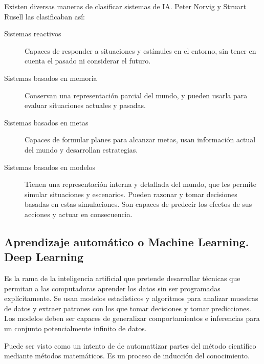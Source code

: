     Existen diversas maneras de clasificar sistemas de IA. Peter Norvig y Struart Rusell las clasificaban así:
    \begin{description}
        \item[Sistemas reactivos] Capaces de responder a situaciones y estímules en el entorno, sin tener en cuenta el pasado ni considerar el futuro.
        \item[Sistemas basados en memoria] Conservan una representación parcial del mundo, y pueden usarla para evaluar situaciones actuales y pasadas.
        \item[Sistemas basados en metas] Capaces de formular planes para alcanzar metas, usan información actual del mundo y desarrollan estrategias.
        \item[Sistemas basados en modelos]  Tienen una representación interna y detallada del mundo, que les permite simular situaciones y escenarios. Pueden razonar y tomar decisiones basadas en estas simulaciones. Son capaces de predecir los efectos de sus acciones y actuar en consecuencia.
    \end{description}

\subsection{Aprendizaje automático o Machine Learning. Deep Learning}
    Es la rama de la inteligencia artificial que pretende desarrollar técnicas que permitan a las computadoras aprender los datos sin ser programadas explícitamente. Se usan modelos estadísticos y algoritmos para analizar muestras de datos y extraer patrones con los que tomar decisiones y tomar predicciones. Los modelos deben ser capaces de generalizar comportamientos e inferencias para un conjunto potencialmente infinito de datos.

    Puede ser visto como un intento de de automattizar partes del método científico mediante métodos matemáticos. Es un proceso de inducción del conocimiento.
